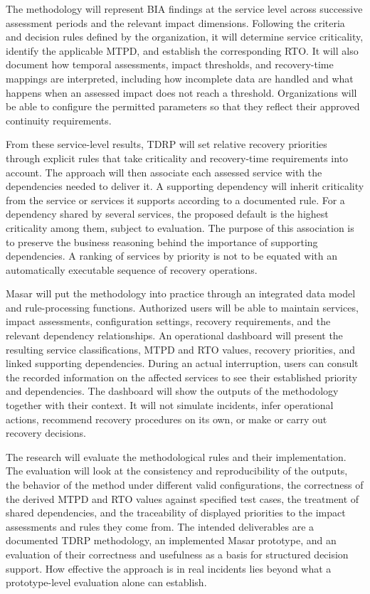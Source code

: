 The methodology will represent BIA findings at the service level across successive assessment periods and the relevant impact dimensions. Following the criteria and decision rules defined by the organization, it will determine service criticality, identify the applicable MTPD, and establish the corresponding RTO. It will also document how temporal assessments, impact thresholds, and recovery-time mappings are interpreted, including how incomplete data are handled and what happens when an assessed impact does not reach a threshold. Organizations will be able to configure the permitted parameters so that they reflect their approved continuity requirements.

From these service-level results, TDRP will set relative recovery priorities through explicit rules that take criticality and recovery-time requirements into account. The approach will then associate each assessed service with the dependencies needed to deliver it. A supporting dependency will inherit criticality from the service or services it supports according to a documented rule. For a dependency shared by several services, the proposed default is the highest criticality among them, subject to evaluation. The purpose of this association is to preserve the business reasoning behind the importance of supporting dependencies. A ranking of services by priority is not to be equated with an automatically executable sequence of recovery operations.

Masar will put the methodology into practice through an integrated data model and rule-processing functions. Authorized users will be able to maintain services, impact assessments, configuration settings, recovery requirements, and the relevant dependency relationships. An operational dashboard will present the resulting service classifications, MTPD and RTO values, recovery priorities, and linked supporting dependencies. During an actual interruption, users can consult the recorded information on the affected services to see their established priority and dependencies. The dashboard will show the outputs of the methodology together with their context. It will not simulate incidents, infer operational actions, recommend recovery procedures on its own, or make or carry out recovery decisions.

The research will evaluate the methodological rules and their implementation. The evaluation will look at the consistency and reproducibility of the outputs, the behavior of the method under different valid configurations, the correctness of the derived MTPD and RTO values against specified test cases, the treatment of shared dependencies, and the traceability of displayed priorities to the impact assessments and rules they come from. The intended deliverables are a documented TDRP methodology, an implemented Masar prototype, and an evaluation of their correctness and usefulness as a basis for structured decision support. How effective the approach is in real incidents lies beyond what a prototype-level evaluation alone can establish.
